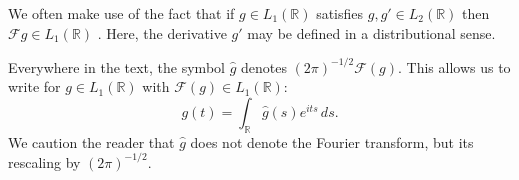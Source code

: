     We often make use of the fact that if $g \in L_1(\mathbb{R})$ satisfies $g,g' \in L_2(\mathbb{R})$ then $\mathcal{F}g \in L_1(\mathbb{R})$ \cite[Lemma 7]{PS-crelle}.
    Here, the derivative $g'$ may be defined in a distributional sense. 
    
    Everywhere in the text, the symbol $\hat{g}$ denotes $(2\pi)^{-1/2}\mathcal{F}(g)$. This allows us to write for $g \in L_1(\mathbb{R})$ with $\mathcal{F}(g) \in L_1(\mathbb{R})$:
    \begin{equation*}
        g(t) = \int_{\mathbb{R}} \hat{g}(s)e^{its}\,ds.
    \end{equation*}
    We caution the reader that $\hat{g}$ does not denote the Fourier transform, but its rescaling by $(2\pi)^{-1/2}$.

    
